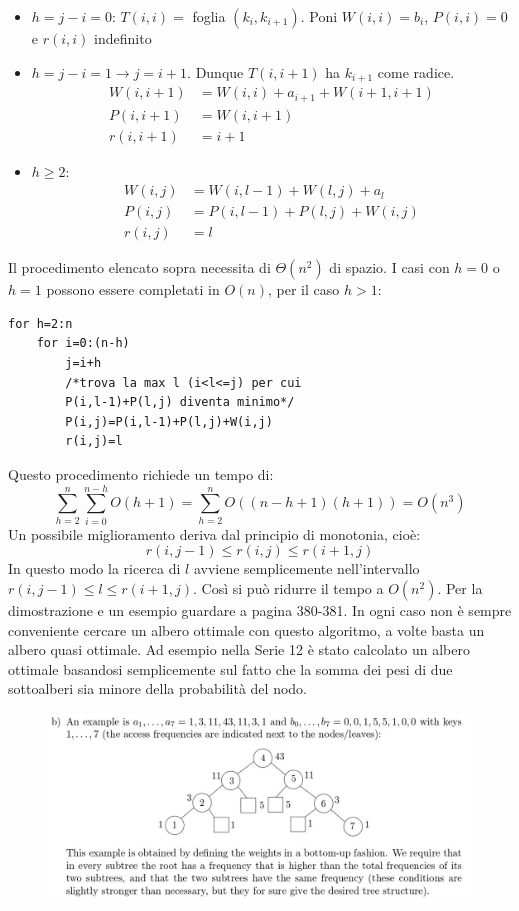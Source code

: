 \documentclass[a4paper]{book}
\newcommand{\lstIndent}{4}
\begin{document}
\begin{itemize}
\item $h=j-i=0$: $T(i,i)=$ foglia $(k_i, k_{i+1})$. Poni $W(i,i)=b_i$, $P(i,i)=0$ e $r(i,i)$ indefinito
\item $h=j-i=1 \rightarrow j=i+1$. Dunque $T(i,i+1)$ ha $k_{i+1}$ come radice. 
\begin{align*}
W(i,i+1)&=W(i,i)+a_{i+1}+W(i+1,i+1)\\
P(i,i+1)&=W(i,i+1)\\
r(i,i+1)&=i+1
\end{align*}
\item $h\geq 2$: 
\begin{align*}
W(i,j)&=W(i,l-1)+W(l,j)+a_l\\
P(i,j)&=P(i,l-1)+P(l,j)+W(i,j)\\
r(i,j)&=l
\end{align*}
\end{itemize}
Il procedimento elencato sopra necessita di $\Theta (n^2)$ di spazio. I casi con $h=0$ o $h=1$ possono essere completati in $O(n)$, per il caso $h>1$:
\begin{lstlisting}[tabsize=\lstIndent]
for h=2:n
	for i=0:(n-h)
		j=i+h
		/*trova la max l (i<l<=j) per cui
		P(i,l-1)+P(l,j) diventa minimo*/
		P(i,j)=P(i,l-1)+P(l,j)+W(i,j)
		r(i,j)=l		
\end{lstlisting}
Questo procedimento richiede un tempo di:
$$\sum_{h=2}^n \sum_{i=0}^{n-h} O(h+1)=\sum_{h=2}^n O((n-h+1)(h+1))= O(n^3)$$
Un possibile miglioramento deriva dal principio di monotonia, cioè:
$$r(i,j-1)\leq r(i,j) \leq r(i+1,j)$$
In questo modo la ricerca di $l$ avviene semplicemente nell'intervallo $r(i,j-1)\leq l \leq r(i+1,j)$. Così si può ridurre il tempo a $O(n^2)$. Per la dimostrazione e un esempio guardare a pagina 380-381.
In ogni caso non è sempre conveniente cercare un albero ottimale con questo algoritmo, a volte basta un albero quasi ottimale. Ad esempio nella Serie 12 è stato calcolato un albero ottimale basandosi semplicemente sul fatto che la somma dei pesi di due sottoalberi sia minore della probabilità del nodo.
\begin{figure}[H]
\centering
\includegraphics[scale=0.3]{Figures/optimaltree.jpg}
\end{figure} 
\end{document}
